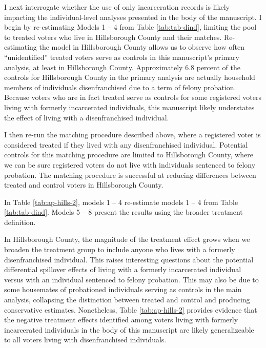 \documentclass[
  12pt,
]{article}
\begin{document}
I next interrogate whether the use of only incarceration records is likely impacting the individual-level analyses presented in the body of the manuscript. I begin by re-estimating Models 1 -- 4 from Table \ref{tab:tab-dind}, limiting the pool to treated voters who live in Hillsborough County and their matches. Re-estimating the model in Hillsborough County allows us to observe how often ``unidentified'' treated voters serve as controls in this manuscript's primary analysis, at least in Hillsborough County. Approximately 6.8 percent of the controls for Hillsborough County in the primary analysis are actually household members of individuals disenfranchised due to a term of felony probation. Because voters who are in fact treated serve as controls for some registered voters living with formerly incarcerated individuals, this manuscript likely understates the effect of living with a disenfranchised individual.

I then re-run the matching procedure described above, where a registered voter is considered treated if they lived with any disenfranchised individual. Potential controls for this matching procedure are limited to Hillsborough County, where we can be sure registered voters do not live with individuals sentenced to felony probation. The matching procedure is successful at reducing differences between treated and control voters in Hillsborough County.

In Table \ref{tab:ap-hills-2}, models 1 -- 4 re-estimate models 1 -- 4 from Table \ref{tab:tab-dind}. Models 5 -- 8 present the results using the broader treatment definition.

\begin{singlespace}

\end{singlespace}

In Hillsborough County, the magnitude of the treatment effect grows when we broaden the treatment group to include anyone who lives with a formerly disenfranchised individual. This raises interesting questions about the potential differential spillover effects of living with a formerly incarcerated individual versus with an individual sentenced to felony probation. This may also be due to some housemates of probationed individuals serving as controls in the main analysis, collapsing the distinction between treated and control and producing conservative estimates. Nonetheless, Table \ref{tab:ap-hills-2} provides evidence that the negative treatment effects identified among voters living with formerly incarcerated individuals in the body of this manuscript are likely generalizeable to all voters living with disenfranchised individuals.
\end{document}
